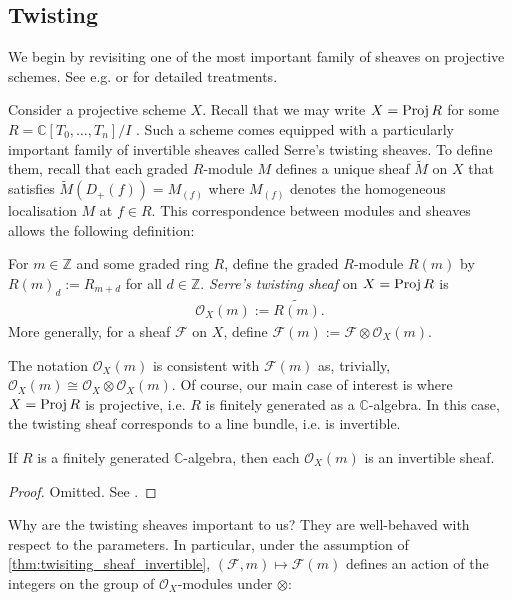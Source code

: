 \documentclass[12pt]{ociamthesis}  %
\begin{document}
\subsection{Twisting}\label{sec:twisting_sheaves}

We begin by revisiting one of the most important family of sheaves
on projective schemes. See e.g. \cite{gortz2010} or
\cite{hartshorne1977} for detailed treatments.

Consider a projective scheme $X$. Recall that we may write
$X=\operatorname{Proj} R$ for some $R=\mathbb{C}[T_0,\ldots,T_n]/I$ \cite[II Corollary 5.16]{hartshorne1977}. Such a scheme comes
equipped with a particularly important family of invertible sheaves
called Serre's twisting sheaves. To define them, recall that each
graded $R$-module $M$ defines a unique sheaf $\tilde M$ on $X$
that satisfies $\tilde M (D_+(f)) = M_{(f)}$ where $M_{(f)}$
denotes the homogeneous localisation $M$ at $f\in R$. This
correspondence between modules and sheaves allows the following
definition:

\begin{definition}
  For $m\in\mathbb{Z}$ and some graded ring $R$, define the graded
  $R$-module $R(m)$ by $R(m)_d := R_{m+d}$ for all $d\in\mathbb{Z}$. \emph{Serre's
    twisting sheaf} on $X=\operatorname{Proj} R$ is
  \begin{align*}
    \mathscr O_X(m) := \widetilde{R(m)}.
  \end{align*}
  More generally, for a sheaf $\mathscr F$ on $X$, define
  $\mathscr F(m) := \mathscr F \otimes \mathscr O_X(m)$.
\end{definition}
The notation $\mathscr O_X(m)$ is consistent with $\mathscr F(m)$
as, trivially, $\mathscr O_X(m) \cong \mathscr O_X \otimes \mathscr O_X(m)$.
Of course, our main case of interest is where $X=\operatorname{Proj} R$ is
projective, i.e. $R$ is finitely generated as a $\mathbb C$-algebra.
In this case, the twisting sheaf corresponds to a line bundle,
i.e. is invertible.

\begin{proposition}
  \label{thm:twisiting_sheaf_invertible}
  If $R$ is a finitely generated $\mathbb C$-algebra, then each
  $\mathscr O_X(m)$ is an invertible sheaf.
  \begin{proof}
    Omitted. See \cite[Proposition 13.15]{gortz2010}.
  \end{proof}
\end{proposition}

Why are the twisting sheaves important to us?  They are well-behaved
with respect to the parameters. In particular,
under the assumption of \ref{thm:twisiting_sheaf_invertible},
$(\mathscr F,m)\mapsto \mathscr F(m)$ defines an action of
the integers on the group of $\mathscr O_X$-modules under
$\otimes$:
\end{document}
